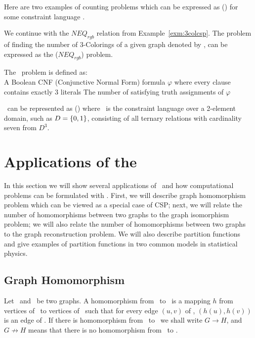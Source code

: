 Here are two examples of counting problems which can be expressed as \ccsp(\mrelset) for some
constraint language \mrelset\@.
\begin{example}[\ctcol]
We continue with the \(NEQ_{rgb}\) relation from Example~\ref{exm:3colcsp}\@.
The problem of finding the number of 3-Colorings of a given graph denoted by 
\ctcol, can be expressed as the \ccsp(\(NEQ_{rgb}\)) problem.
\end{example}

\begin{example}\label{example:c3sat}
The \ctsat\ problem is defined as:\\
\pnndef%
{A Boolean CNF (Conjunctive Normal Form) formula \(\varphi\) 
where every clause contains exactly 3 literals}
{The number of satisfying truth assignments of \(\varphi\)}

\ctsat\ can be represented as \ccsp(\mrelset) where \mrelset\ is the constraint language
over a 2-element domain, such as \(D=\{{{0,1}}\}\), consisting of all 
ternary relations with cardinality seven from \(D^3\).
\end{example}
\section{Applications of the \ccsp} \label{sec:appl}
In this section we will show several applications of \ccsp\ and how computational problems
can be formulated with \ccsp\@. First, we will describe graph
homomorphism problem which can be viewed as a special case of CSP; next, we will relate
the number of homomorphisms between two graphs to the graph isomorphism problem;
we will also relate the number of homomorphisms between two graphs to
the graph reconstruction problem. We will also describe partition functions
and give examples of partition functions in two common models in statistical physics.

\subsection*{Graph Homomorphism}
Let \mG\ and \mH\ be two graphs. A homomorphism from \mG\ to \mH\ is a mapping \(h\) from
vertices of \mG\ to vertices of \mH\ such that for every edge \((u,v)\) of \mG,
\((h(u),h(v))\) is an edge of \mH\@. If there is homomorphism from \mG\ to \mH\ 
we shall write \(G\to H\), and \(G \not\to H\) means that there is no homomorphism from
\mG\ to \mH\@.

